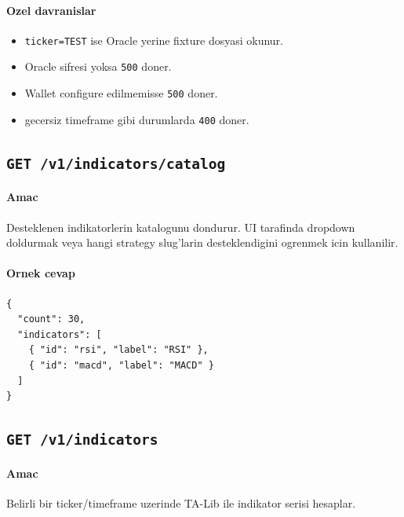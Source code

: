 \documentclass[11pt,a4paper]{article}
\begin{document}
\paragraph{Ozel davranislar}
\begin{itemize}[leftmargin=1.5em]
    \item \texttt{ticker=TEST} ise Oracle yerine fixture dosyasi okunur.
    \item Oracle sifresi yoksa \texttt{500} doner.
    \item Wallet configure edilmemisse \texttt{500} doner.
    \item gecersiz timeframe gibi durumlarda \texttt{400} doner.
\end{itemize}

\subsection{\texttt{GET /v1/indicators/catalog}}

\paragraph{Amac}
Desteklenen indikatorlerin katalogunu dondurur. UI tarafinda dropdown doldurmak veya hangi strategy slug'larin desteklendigini ogrenmek icin kullanilir.

\paragraph{Ornek cevap}
\begin{lstlisting}
{
  "count": 30,
  "indicators": [
    { "id": "rsi", "label": "RSI" },
    { "id": "macd", "label": "MACD" }
  ]
}
\end{lstlisting}

\subsection{\texttt{GET /v1/indicators}}

\paragraph{Amac}
Belirli bir ticker/timeframe uzerinde TA-Lib ile indikator serisi hesaplar.
\end{document}
